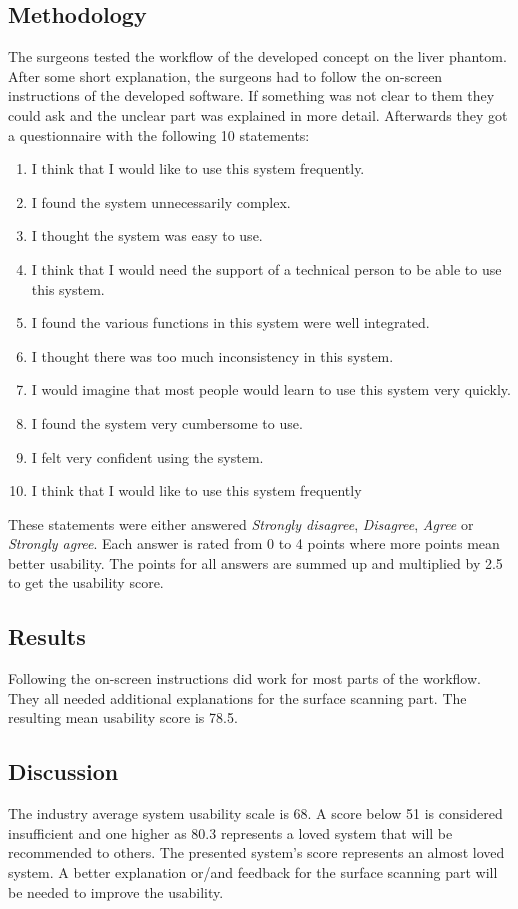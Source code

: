 \subsection{Methodology}
The surgeons tested the workflow of the developed concept on the liver phantom.
After some short explanation, the surgeons had to follow the on-screen
instructions of the developed software. If something was not clear to them they
could ask and the unclear part was explained in more detail. Afterwards they got
a questionnaire with the following 10 statements:
\begin{enumerate}
  \item{I think that I would like to use this system frequently.}
  \item{I found the system unnecessarily complex.}
  \item{I thought the system was easy to use.}
  \item{I think that I would need the support of a technical person to be able to use this system.}
  \item{I found the various functions in this system were well integrated.}
  \item{I thought there was too much inconsistency in this system.}
  \item{I would imagine that most people would learn to use this system very quickly.}
  \item{I found the system very cumbersome to use.}
  \item{I felt very confident using the system.}
  \item{I think that I would like to use this system frequently}
\end{enumerate}
These statements were either answered \textit{Strongly disagree},
\textit{Disagree}, \textit{Agree} or \textit{Strongly agree}. Each answer is
rated from 0 to 4 points where more points mean better usability. The points for
all answers are summed up and multiplied by 2.5 to get the usability score.
\subsection{Results}
Following the on-screen instructions did work for most parts of the workflow.
They all needed additional explanations for the surface scanning part. 
The resulting mean usability score is 78.5. 
\subsection{Discussion}
The industry average system usability scale is 68. A score below 51 is
considered insufficient and one higher as 80.3 represents a loved system that will be 
recommended to others. The presented system's score represents an almost loved
system. A better explanation or/and feedback for the surface scanning part will
be needed to improve the usability.

